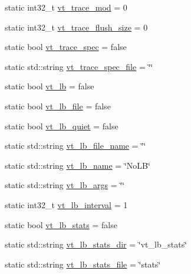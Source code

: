 \begin{DoxyCompactItemize}
static int32\+\_\+t \hyperlink{structvt_1_1arguments_1_1_arg_config_acb14bb6b6f58db2a35bc71a4c6c06799}{vt\+\_\+trace\+\_\+mod} = 0
\item 
static int32\+\_\+t \hyperlink{structvt_1_1arguments_1_1_arg_config_a8f122ed882f2de1f03091edbe64f1f2b}{vt\+\_\+trace\+\_\+flush\+\_\+size} = 0
\item 
static bool \hyperlink{structvt_1_1arguments_1_1_arg_config_a5985e792d6c3810293b54dda059460bd}{vt\+\_\+trace\+\_\+spec} = false
\item 
static std\+::string \hyperlink{structvt_1_1arguments_1_1_arg_config_a0369ed37706b8e7d563cd8f25763a56c}{vt\+\_\+trace\+\_\+spec\+\_\+file} = \char`\"{}\char`\"{}
\item 
static bool \hyperlink{structvt_1_1arguments_1_1_arg_config_aab51ec67928526875a458f982e5fa90c}{vt\+\_\+lb} = false
\item 
static bool \hyperlink{structvt_1_1arguments_1_1_arg_config_a970d5784bfb69a34a04ec393fcd41cf6}{vt\+\_\+lb\+\_\+file} = false
\item 
static bool \hyperlink{structvt_1_1arguments_1_1_arg_config_ab0a9812811750643510b00fb7c0651a5}{vt\+\_\+lb\+\_\+quiet} = false
\item 
static std\+::string \hyperlink{structvt_1_1arguments_1_1_arg_config_adadeb5ba97bec396d11b5c856736bd3e}{vt\+\_\+lb\+\_\+file\+\_\+name} = \char`\"{}\char`\"{}
\item 
static std\+::string \hyperlink{structvt_1_1arguments_1_1_arg_config_a856cdf90d67403a08574e5a7a3ca792c}{vt\+\_\+lb\+\_\+name} = \char`\"{}No\+LB\char`\"{}
\item 
static std\+::string \hyperlink{structvt_1_1arguments_1_1_arg_config_aa9c190d04d0c6f9b3dac4ac56ac1a721}{vt\+\_\+lb\+\_\+args} = \char`\"{}\char`\"{}
\item 
static int32\+\_\+t \hyperlink{structvt_1_1arguments_1_1_arg_config_a273268a11a1525ad3754c72f5e6494b3}{vt\+\_\+lb\+\_\+interval} = 1
\item 
static bool \hyperlink{structvt_1_1arguments_1_1_arg_config_adf22250e9e2d60c5c57f41b8050f4697}{vt\+\_\+lb\+\_\+stats} = false
\item 
static std\+::string \hyperlink{structvt_1_1arguments_1_1_arg_config_a279d3953c475ea80bac06e2ed5ba6b5f}{vt\+\_\+lb\+\_\+stats\+\_\+dir} = \char`\"{}vt\+\_\+lb\+\_\+stats\char`\"{}
\item 
static std\+::string \hyperlink{structvt_1_1arguments_1_1_arg_config_ad6c76c8ec1dd43338a10f35929ce53f7}{vt\+\_\+lb\+\_\+stats\+\_\+file} = \char`\"{}stats\char`\"{}

\end{DoxyCompactItemize}
